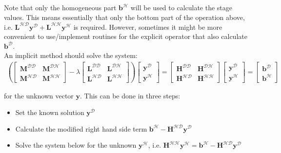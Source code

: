 Note that only the homogeneous part $\boldsymbol{b}^{\mathcal{H}}$ will be used
to calculate the stage values. This means essentially that only the bottom part
of the operation above, i.e.
$\boldsymbol{L}^{\mathcal{HD}}\boldsymbol{y}^{\mathcal{D}} +
\boldsymbol{L}^{\mathcal{HH}}\boldsymbol{y}^{\mathcal{H}}$ is required. However,
sometimes it might be more convenient to use/implement routines for the explicit
operator that also calculate $\boldsymbol{b}^{\mathcal{D}}$.\\
 
An implicit method should solve the system:
\begin{align*}
\left(\left[ \begin{array}{cc}
\boldsymbol{M}^{\mathcal{DD}} & \boldsymbol{M}^{\mathcal{DH}} \\
\boldsymbol{M}^{\mathcal{HD}} & \boldsymbol{M}^{\mathcal{HH}} \end{array} \right]
- \lambda \left[ \begin{array}{cc}
\boldsymbol{L}^{\mathcal{DD}} & \boldsymbol{L}^{\mathcal{DH}} \\
\boldsymbol{L}^{\mathcal{HD}} & \boldsymbol{L}^{\mathcal{HH}} \end{array} \right]\right)
\left[ \begin{array}{c}
\boldsymbol{y}^{\mathcal{D}} \\
\boldsymbol{y}^{\mathcal{H}} \end{array} \right]
=
\left[ \begin{array}{cc}
\boldsymbol{H}^{\mathcal{DD}} & \boldsymbol{H}^{\mathcal{DH}} \\
\boldsymbol{H}^{\mathcal{HD}} & \boldsymbol{H}^{\mathcal{HH}} \end{array} \right]
\left[ \begin{array}{c}
\boldsymbol{y}^{\mathcal{D}} \\
\boldsymbol{y}^{\mathcal{H}} \end{array} \right]
=
\left[ \begin{array}{c}
\boldsymbol{b}^{\mathcal{D}} \\
\boldsymbol{b}^{\mathcal{H}} \end{array} \right]
\end{align*}
    
for the unknown vector $\boldsymbol{y}$. This can be done in three steps:
\begin{itemize}
\item Set the known solution $\boldsymbol{y}^{\mathcal{D}}$
\item Calculate the modified right hand side term
 $\boldsymbol{b}^{\mathcal{H}} -
 \boldsymbol{H}^{\mathcal{HD}}\boldsymbol{y}^{\mathcal{D}}$
\item Solve the system below for the unknown
 $\boldsymbol{y}^{\mathcal{H}}$, i.e.
 $\boldsymbol{H}^{\mathcal{HH}}\boldsymbol{y}^{\mathcal{H}} =
 \boldsymbol{b}^{\mathcal{H}} -
 \boldsymbol{H}^{\mathcal{HD}}\boldsymbol{y}^{\mathcal{D}}$
\end{itemize}

